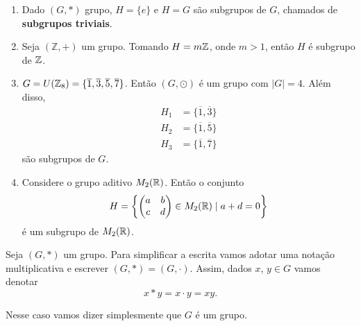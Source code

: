 \begin{exemplos}
	\begin{enumerate}[label={\arabic*})]
		\item Dado $(G,*)$ grupo, $H=\{e\}$ e $H=G$ s{\~a}o subgrupos de $G$, chamados de \textbf{subgrupos triviais}.
		
		\item Seja $(\mathbb{Z},+)$ um grupo. Tomando $H = m\mathbb{Z}$, onde $m > 1$, ent{\~a}o $H$ {\'e} subgrupo de $\mathbb{Z}$.
		
		\item $G = U(\mathbb{Z}_8) = \{\overline{1}, \overline{3}, \overline{5}, \overline{7}\}$. Ent\~ao $(G,\odot)$ {\'e} um grupo com $|G| = 4$. Al\'em disso,
		\begin{align*}
			H_1 &= \{\overline{1}, \overline{3}\}\\
			H_2 &= \{\overline{1}, \overline{5}\}\\
			H_3 &= \{\overline{1}, \overline{7}\}
		\end{align*}
		s\~ao subgrupos de $G$.

		\item Considere o grupo aditivo $M_2(\mathbb{R})$. Ent\~ao o conjunto
        \[
            H = \left\{\begin{pmatrix}
                a & b\\c & d
            \end{pmatrix} \in M_2(\mathbb{R}) \mid a + d = 0\right\} 
        \]
        \'e um subgrupo de $M_2(\mathbb{R})$.
	\end{enumerate}
\end{exemplos}

Seja $(G, *)$ um grupo. Para simplificar a escrita vamos adotar uma nota\c{c}\~ao multiplicativa e escrever $(G, *) = (G, \cdot)$. Assim, dados $x$, $y \in G$ vamos denotar
\[
    x * y = x \cdot y = xy.
\]

Nesse caso vamos dizer simplesmente que $G$ \'e um grupo.

